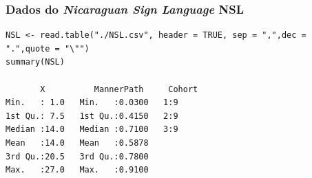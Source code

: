 \documentclass[graphics,14pt]{beamer}
\begin{document}
\begin{frame}[t,fragile=singleslide]
\frametitle{Dados do \textit{Nicaraguan Sign Language} NSL \cite{Levshina2015}}

\begin{lstlisting}
NSL <- read.table("./NSL.csv", header = TRUE, sep = ",",dec = ".",quote = "\"")
summary(NSL)

       X          MannerPath     Cohort
Min.   : 1.0   Min.   :0.0300   1:9   
1st Qu.: 7.5   1st Qu.:0.4150   2:9   
Median :14.0   Median :0.7100   3:9   
Mean   :14.0   Mean   :0.5878         
3rd Qu.:20.5   3rd Qu.:0.7800         
Max.   :27.0   Max.   :0.9100    
\end{lstlisting}
\end{frame}
\end{document}
